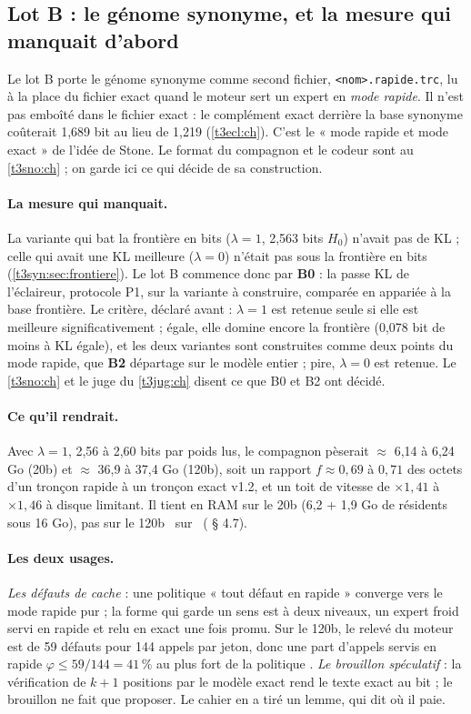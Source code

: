 \subsection{Lot B : le génome synonyme, et la mesure qui manquait d'abord}\label{t3syn:sec:lot-b}

Le lot B porte le génome synonyme comme second fichier, \texttt{<nom>.rapide.trc}, lu à la place du fichier exact quand le moteur sert un expert en \emph{mode rapide}. Il n'est pas emboîté dans le fichier exact : le complément exact derrière la base synonyme coûterait 1,689 bit au lieu de 1,219 (\cref{t3ecl:ch}). C'est le « mode rapide et mode exact » de l'idée de Stone. Le format du compagnon et le codeur sont au \cref{t3sno:ch} ; on garde ici ce qui décide de sa construction.

\paragraph{La mesure qui manquait.} La variante qui bat la frontière en bits ($\lambda = 1$, 2,563 bits $H_0$) n'avait pas de KL ; celle qui avait une KL meilleure ($\lambda = 0$) n'était pas sous la frontière en bits (\cref{t3syn:sec:frontiere}). Le lot B commence donc par \textbf{B0} : la passe KL de l'éclaireur, protocole P1, sur la variante à construire, comparée en appariée à la base frontière. Le critère, déclaré avant : $\lambda = 1$ est retenue seule si elle est meilleure significativement ; égale, elle domine encore la frontière (0,078 bit de moins à KL égale), et les deux variantes sont construites comme deux points du mode rapide, que \textbf{B2} départage sur le modèle entier ; pire, $\lambda = 0$ est retenue. Le \cref{t3sno:ch} et le juge du \cref{t3jug:ch} disent ce que B0 et B2 ont décidé.

\paragraph{Ce qu'il rendrait.} Avec $\lambda = 1$, 2,56 à 2,60 bits par poids lus, le compagnon pèserait $\approx$ 6,14 à 6,24 Go (20b) et $\approx$ 36,9 à 37,4 Go (120b), soit un rapport $f \approx 0{,}69$ à $0{,}71$ des octets d'un tronçon rapide à un tronçon exact v1.2, et un toit de vitesse de $\times 1{,}41$ à $\times 1{,}46$ à disque limitant. Il tient en RAM sur le 20b (6,2 + 1,9 Go de résidents sous 16 Go), pas sur le 120b \calc~sur \mes~( § 4.7).

\paragraph{Les deux usages.} \emph{Les défauts de cache} : une politique « tout défaut en rapide » converge vers le mode rapide pur ; la forme qui garde un sens est à deux niveaux, un expert froid servi en rapide et relu en exact une fois promu. Sur le 120b, le relevé du moteur est de 59 défauts pour 144 appels par jeton, donc une part d'appels servis en rapide $\varphi \le 59/144 = 41\,\%$ au plus fort de la politique \calc. \emph{Le brouillon spéculatif} \parencite{leviathan2023} : la vérification de $k+1$ positions par le modèle exact rend le texte exact au bit ; le brouillon ne fait que proposer. Le cahier en a tiré un lemme, qui dit où il paie.

